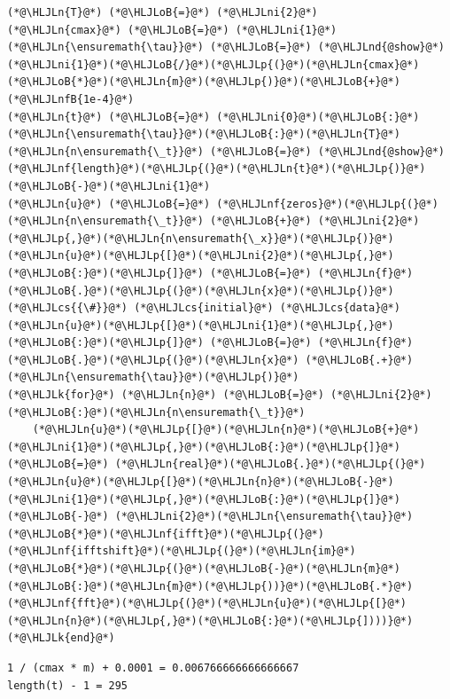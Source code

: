 \documentclass[12pt,a4paper]{article}
\newcommand{\HLJLk}[1]{\textcolor[RGB]{148,91,176}{\textbf{#1}}}
\newcommand{\HLJLn}[1]{#1}
\newcommand{\HLJLnd}[1]{\textcolor[RGB]{214,102,97}{#1}}
\newcommand{\HLJLnf}[1]{\textcolor[RGB]{66,102,213}{#1}}
\newcommand{\HLJLnfB}[1]{\textcolor[RGB]{59,151,46}{#1}}
\newcommand{\HLJLni}[1]{\textcolor[RGB]{59,151,46}{#1}}
\newcommand{\HLJLoB}[1]{\textcolor[RGB]{102,102,102}{\textbf{#1}}}
\newcommand{\HLJLp}[1]{#1}
\newcommand{\HLJLcs}[1]{\textcolor[RGB]{153,153,119}{\textit{#1}}}
\begin{document}
\begin{lstlisting}
(*@\HLJLn{T}@*) (*@\HLJLoB{=}@*) (*@\HLJLni{2}@*)
(*@\HLJLn{cmax}@*) (*@\HLJLoB{=}@*) (*@\HLJLni{1}@*)
(*@\HLJLn{\ensuremath{\tau}}@*) (*@\HLJLoB{=}@*) (*@\HLJLnd{@show}@*) (*@\HLJLni{1}@*)(*@\HLJLoB{/}@*)(*@\HLJLp{(}@*)(*@\HLJLn{cmax}@*)(*@\HLJLoB{*}@*)(*@\HLJLn{m}@*)(*@\HLJLp{)}@*)(*@\HLJLoB{+}@*)(*@\HLJLnfB{1e-4}@*)
(*@\HLJLn{t}@*) (*@\HLJLoB{=}@*) (*@\HLJLni{0}@*)(*@\HLJLoB{:}@*)(*@\HLJLn{\ensuremath{\tau}}@*)(*@\HLJLoB{:}@*)(*@\HLJLn{T}@*)
(*@\HLJLn{n\ensuremath{\_t}}@*) (*@\HLJLoB{=}@*) (*@\HLJLnd{@show}@*) (*@\HLJLnf{length}@*)(*@\HLJLp{(}@*)(*@\HLJLn{t}@*)(*@\HLJLp{)}@*)(*@\HLJLoB{-}@*)(*@\HLJLni{1}@*)
(*@\HLJLn{u}@*) (*@\HLJLoB{=}@*) (*@\HLJLnf{zeros}@*)(*@\HLJLp{(}@*)(*@\HLJLn{n\ensuremath{\_t}}@*) (*@\HLJLoB{+}@*) (*@\HLJLni{2}@*)(*@\HLJLp{,}@*)(*@\HLJLn{n\ensuremath{\_x}}@*)(*@\HLJLp{)}@*)
(*@\HLJLn{u}@*)(*@\HLJLp{[}@*)(*@\HLJLni{2}@*)(*@\HLJLp{,}@*)(*@\HLJLoB{:}@*)(*@\HLJLp{]}@*) (*@\HLJLoB{=}@*) (*@\HLJLn{f}@*)(*@\HLJLoB{.}@*)(*@\HLJLp{(}@*)(*@\HLJLn{x}@*)(*@\HLJLp{)}@*)  (*@\HLJLcs{{\#}}@*) (*@\HLJLcs{initial}@*) (*@\HLJLcs{data}@*)
(*@\HLJLn{u}@*)(*@\HLJLp{[}@*)(*@\HLJLni{1}@*)(*@\HLJLp{,}@*)(*@\HLJLoB{:}@*)(*@\HLJLp{]}@*) (*@\HLJLoB{=}@*) (*@\HLJLn{f}@*)(*@\HLJLoB{.}@*)(*@\HLJLp{(}@*)(*@\HLJLn{x}@*) (*@\HLJLoB{.+}@*) (*@\HLJLn{\ensuremath{\tau}}@*)(*@\HLJLp{)}@*)
(*@\HLJLk{for}@*) (*@\HLJLn{n}@*) (*@\HLJLoB{=}@*) (*@\HLJLni{2}@*)(*@\HLJLoB{:}@*)(*@\HLJLn{n\ensuremath{\_t}}@*)
    (*@\HLJLn{u}@*)(*@\HLJLp{[}@*)(*@\HLJLn{n}@*)(*@\HLJLoB{+}@*)(*@\HLJLni{1}@*)(*@\HLJLp{,}@*)(*@\HLJLoB{:}@*)(*@\HLJLp{]}@*) (*@\HLJLoB{=}@*) (*@\HLJLn{real}@*)(*@\HLJLoB{.}@*)(*@\HLJLp{(}@*)(*@\HLJLn{u}@*)(*@\HLJLp{[}@*)(*@\HLJLn{n}@*)(*@\HLJLoB{-}@*)(*@\HLJLni{1}@*)(*@\HLJLp{,}@*)(*@\HLJLoB{:}@*)(*@\HLJLp{]}@*) (*@\HLJLoB{-}@*) (*@\HLJLni{2}@*)(*@\HLJLn{\ensuremath{\tau}}@*)(*@\HLJLoB{*}@*)(*@\HLJLnf{ifft}@*)(*@\HLJLp{(}@*)(*@\HLJLnf{ifftshift}@*)(*@\HLJLp{(}@*)(*@\HLJLn{im}@*)(*@\HLJLoB{*}@*)(*@\HLJLp{(}@*)(*@\HLJLoB{-}@*)(*@\HLJLn{m}@*)(*@\HLJLoB{:}@*)(*@\HLJLn{m}@*)(*@\HLJLp{))}@*)(*@\HLJLoB{.*}@*)(*@\HLJLnf{fft}@*)(*@\HLJLp{(}@*)(*@\HLJLn{u}@*)(*@\HLJLp{[}@*)(*@\HLJLn{n}@*)(*@\HLJLp{,}@*)(*@\HLJLoB{:}@*)(*@\HLJLp{])))}@*)
(*@\HLJLk{end}@*)
\end{lstlisting}

\begin{lstlisting}
1 / (cmax * m) + 0.0001 = 0.006766666666666667
length(t) - 1 = 295
\end{lstlisting}
\end{document}
